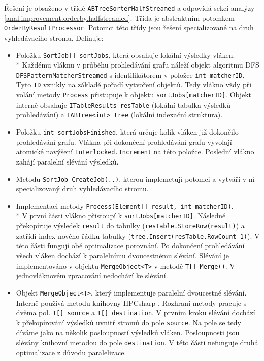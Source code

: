 Řešení je obsaženo v třídě \texttt{ABTreeSorterHalfStreamed} a odpovídá sekci analýzy \ref{anal.improvement.orderby.halfstreamed}.
Třída je abstraktním potomkem \texttt{OrderByResultProcessor}.
Potomci této třídy jsou řešení specializované na druh vyhledávacího stromu.
Definuje:
\begin{itemize}

\item Položku \texttt{SortJob[] sortJobs}, která obsahuje lokální výsledky vláken. \\*
Každému vláknu v průběhu prohledávání grafu náleží objekt algoritmu DFS \texttt{DFSPatternMatcherStreamed} s identifikátorem v položce \texttt{int matcherID}.
Tyto \texttt{ID} vznikly na základě pořadí vytvoření objektů.
Tedy vlákno vždy při volání metody \texttt{Process} přistupuje k objektu \texttt{sortJobs[matcherID]}. 
Objekt interně obsahuje \texttt{ITableResults resTable} (lokální tabulka výsledků prohledávání) a \texttt{IABTree<int> tree} (lokální indexační struktura).

\item Položku \texttt{int sortJobsFinished}, která určuje kolik vláken již dokončilo prohledávání grafu.
Vlákna při dokončení prohledávání grafu vyvolají atomické navýšení \texttt{Interlocked.Increment} na této položce.
Poslední vlákno zahájí paralelní slévání výsledků.

\item Metodu \texttt{SortJob CreateJob(..)}, kterou implemetují potomci a vytváří v ní specializovaný druh vyhledávacího stromu.

\item Implementaci metody \texttt{Process(Element[] result, int matcherID)}.\\*
V první části vlákno přistoupí k \texttt{sortJobs[matcherID]}. 
Následně překopíruje výsledek \texttt{result} do tabulky (\texttt{resTable.StoreRow(result)}) a zatřídí index nového řádku tabulky (\texttt{tree.Insert(resTable.RowCount-1)}).
V této části fungují obě optimalizace porovnání.
Po dokončení prohledávání všech vláken dochází k paralelnímu dvoucestnému slévání.
Slévání je implementováno v objektu \texttt{MergeObject<T>} v metodě \texttt{T[] Merge()}.
V jednovláknovém zpracování nedochází ke slévání.
\item Objekt \texttt{MergeObject<T>}, který implementuje paralelní dvoucestné slévání.
Interně používá metodu knihovny HPCsharp \citep{hpcsharp}.
Rozhraní metody pracuje s dvěma pol. 
\texttt{T[] source} a \texttt{T[] destination}.
V prvním kroku slévání dochází k překopírování výsledků uvnitř stromů do pole \texttt{source}.
Na pole se tedy díváme jako na několik posloupností výsledků vláken.
Posloupnosti jsou slévány knihovní metodou do pole \texttt{destination}.
V této části nefunguje druhá optimalizace z důvodu paralelizace.
\end{itemize}
